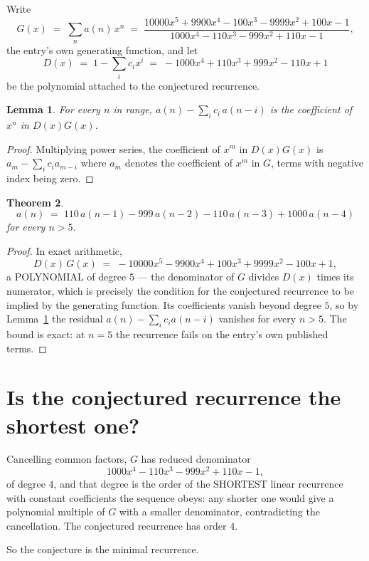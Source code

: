 \documentclass[11pt,a4paper]{article}
\theoremstyle{plain}
\newtheorem{theorem}{Theorem}
\newtheorem{lemma}[theorem]{Lemma}
\theoremstyle{definition}
\begin{document}
Write
\[
G(x)\;=\;\sum_{n}a(n)\,x^{n}\;=\;\frac{10000 x^{5} + 9900 x^{4} - 100 x^{3} - 9999 x^{2} + 100 x - 1}{1000 x^{4} - 110 x^{3} - 999 x^{2} + 110 x - 1},
\]
the entry's own generating function, and let
\[
D(x)\;=\;1-\sum_i c_i x^{i}\;=\;- 1000 x^{4} + 110 x^{3} + 999 x^{2} - 110 x + 1
\]
be the polynomial attached to the conjectured recurrence.

\begin{lemma}\label{lem:key}
For every $n$ in range, $a(n)-\sum_i c_i\,a(n-i)$ is the coefficient of $x^{n}$ in
$D(x)G(x)$.
\end{lemma}

\begin{proof}
Multiplying power series, the coefficient of $x^{m}$ in $D(x)G(x)$ is
$a_m-\sum_i c_i a_{m-i}$ where $a_m$ denotes the coefficient of $x^{m}$ in $G$, terms with
negative index being zero.
\end{proof}

\begin{theorem}
\[
a(n)\;=\;110\,a(n-1) - 999\,a(n-2) - 110\,a(n-3) + 1000\,a(n-4)
\]
for every $n>5$.
\end{theorem}

\begin{proof}
In exact arithmetic,
\[
D(x)\,G(x)\;=\;- 10000 x^{5} - 9900 x^{4} + 100 x^{3} + 9999 x^{2} - 100 x + 1,
\]
a POLYNOMIAL of degree $5$ --- the denominator of $G$ divides $D(x)$ times its numerator,
which is precisely the condition for the conjectured recurrence to be implied by the
generating function. Its coefficients vanish beyond degree $5$, so by
Lemma~\ref{lem:key} the residual $a(n)-\sum_ic_ia(n-i)$ vanishes for every
$n>5$. The bound is exact: at $n=5$ the recurrence fails on the entry's own published terms.
\end{proof}

\section{Is the conjectured recurrence the shortest one?}

Cancelling common factors, $G$ has reduced denominator
\[
1000 x^{4} - 110 x^{3} - 999 x^{2} + 110 x - 1,
\]
of degree $4$, and that degree is the order of the SHORTEST linear recurrence with
constant coefficients the sequence obeys: any shorter one would give a polynomial multiple of
$G$ with a smaller denominator, contradicting the cancellation. The conjectured recurrence has
order $4$.

So the conjecture is the minimal recurrence.
\end{document}

